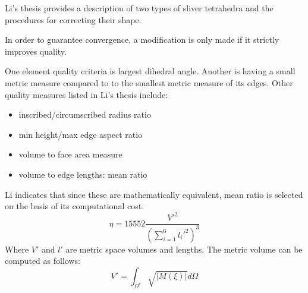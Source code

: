 \documentclass{article}
\begin{document}
Li's thesis provides a description of two types of sliver
tetrahedra and the procedures for correcting their shape.

In order to guarantee convergence, a modification is
only made if it strictly improves quality.

One element quality criteria is largest dihedral angle.
Another is having a small metric measure compared to
to the smallest metric measure of its edges.
Other quality measures listed in Li's thesis include:
\begin{itemize}
\item inscribed/circumscribed radius ratio
\item min height/max edge aspect ratio
\item volume to face area measure
\item volume to edge lengths: mean ratio
\end{itemize}
Li indicates that since these are mathematically equivalent,
mean ratio is selected on the basis of its computational cost.
\[\eta=15552 \frac{{V'}^2}{\left(\sum_{i=1}^6{l_i'}^2\right)^3}\]
Where $V'$ and $l'$ are metric space volumes and lengths.
The metric volume can be computed as follows:
\[V'=\int_{\Omega^e}\sqrt{|M(\xi)|}d\Omega\]
\end{document}
